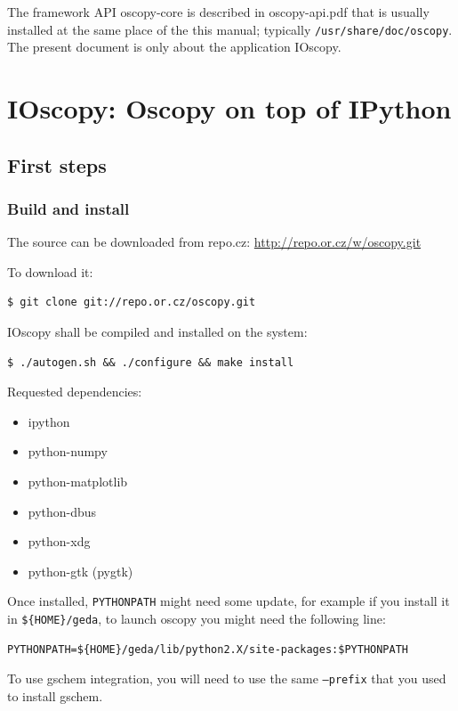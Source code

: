 \documentclass[a4paper,11pt]{article}
\begin{document}
The framework API oscopy-core is described in oscopy-api.pdf that is usually installed at the same place of the this manual; typically \texttt{/usr/share/doc/oscopy}.
The present document is only about the application IOscopy.

\section{IOscopy: Oscopy on top of IPython}

\subsection{First steps}
\subsubsection{Build and install}
The source can be downloaded from repo.cz: \href{http://repo.or.cz/w/oscopy.git}{http://repo.or.cz/w/oscopy.git}

To download it:
\begin{verbatim}
$ git clone git://repo.or.cz/oscopy.git
\end{verbatim}

IOscopy shall be compiled and installed on the system:
\begin{verbatim}
$ ./autogen.sh && ./configure && make install
\end{verbatim}
Requested dependencies:
\begin{itemize}
\item    ipython
\item    python-numpy
\item    python-matplotlib
\item    python-dbus
\item    python-xdg
\item python-gtk (pygtk)
\end{itemize}
Once installed, \texttt{PYTHONPATH} might need some update, for example if you install it in \texttt{\$\{HOME\}/geda}, to launch oscopy you might need the following line:
\begin{verbatim}
PYTHONPATH=${HOME}/geda/lib/python2.X/site-packages:$PYTHONPATH
\end{verbatim}
To use gschem integration, you will need to use the same \texttt{--prefix} that you used to install gschem. 
\end{document}
